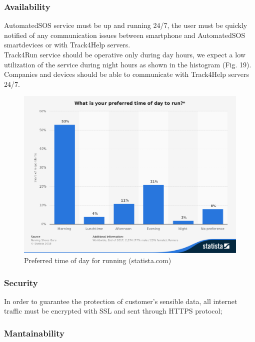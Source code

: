 \documentclass[../main.tex]{subfiles}
\begin{document}
\subsubsection{Availability}


	AutomatedSOS service must be up and running 24/7, the user must be quickly notified of
	any communication issues between smartphone and AutomatedSOS smartdevices or with Track4Help servers.\\
	Track4Run service should be operative only during day hours, we expect a low utilization of the service during night hours as shown
	in the histogram (Fig. 19).\\
	Companies and devices should be able to communicate with Track4Help servers 24/7.

\begin{figure}[H]
	\center
	\includegraphics[scale=0.35]{images/statista_runhours.png}
	\caption{Preferred time of day for running (statista.com)}
\end{figure}

\subsubsection{Security}

In order to guarantee the protection of customer's sensible data, all internet traffic must be encrypted with SSL and sent through HTTPS protocol;


\subsubsection{Mantainability}
\end{document}
